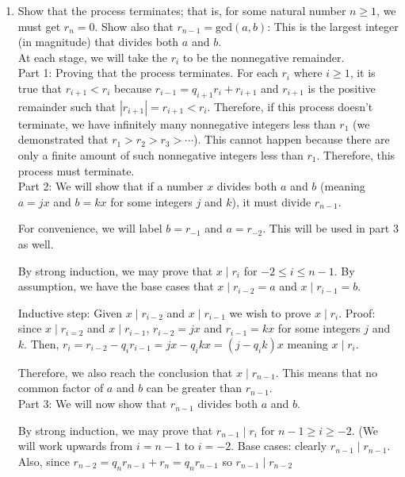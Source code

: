 \documentclass{amsart}
\begin{document}
\begin{enumerate}[itemsep=0.4in]

\item Show that the process terminates; that is, for some natural number $n\geq 1$, we must get $r_n = 0$. Show also that $r_{n-1} = \mathrm{gcd}(a,b)$: This is the largest integer (in magnitude) that divides both $a$ and $b$.\\

At each stage, we will take the $r_i$ to be the nonnegative remainder.\\

Part 1: Proving that the process terminates. For each $r_i$ where $i\geq1$, it is true that $r_{i+1}<r_i$ because $r_{i-1}=q_{i+1}r_i+r_{i+1}$ and $r_{i+1}$ is the positive remainder such that $|r_{i+1}|=r_{i+1}<r_i$. Therefore, if this process doesn't terminate, we have infinitely many nonnegative integers less than $r_1$ (we demonstrated that $r_1>r_2>r_3>\cdots$). This cannot happen because there are only a finite amount of such nonnegative integers less than $r_1$. Therefore, this process must terminate.\\

Part 2: We will show that if a number $x$ divides both $a$ and $b$ (meaning $a=jx$ and $b=kx$ for some integers $j$ and $k$), it must divide $r_{n-1}$.

For convenience, we will label $b=r_{-1}$ and $a=r_{-2}$. This will be used in part 3 as well.

By strong induction, we may prove that $x\mid r_i$ for $-2\leq i\leq n-1$. By assumption, we have the base cases that $x\mid r_{i-2}=a$ and $x\mid r_{i-1}=b$.

Inductive step: Given $x\mid r_{i-2}$ and $x\mid r_{i-1}$ we wish to prove $x\mid r_i$. Proof: since $x\mid r_{i=2}$ and $x\mid r_{i-1}$, $r_{i-2}=jx$ and $r_{i-1}=kx$ for some integers $j$ and $k$. Then, $r_i=r_{i-2}-q_ir_{i-1}=jx-q_ikx=(j-q_ik)x$ meaning $x\mid r_i$. 

Therefore, we also reach the conclusion that $x\mid r_{n-1}$. This means that no common factor of $a$ and $b$ can be greater than $r_{n-1}$.\\

Part 3: We will now show that $r_{n-1}$ divides both $a$ and $b$.

By strong induction, we may prove that $r_{n-1}\mid r_i$ for $n-1\geq i\geq-2$. (We will work upwards from $i=n-1$ to $i=-2$. Base cases: clearly $r_{n-1}\mid r_{n-1}$. Also, since $r_{n-2}=q_nr_{n-1}+r_n=q_nr_{n-1}$ so $r_{n-1}\mid r_{n-2}$


\end{enumerate}
\end{document}
